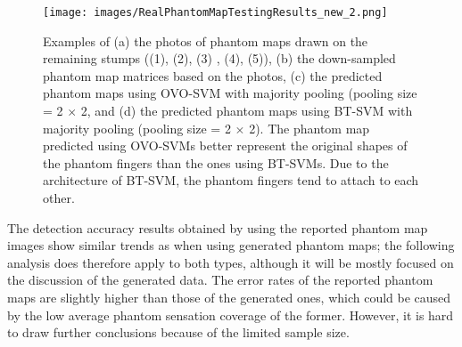  \begin{figure}[hbt!]
 \centering
 \texttt{[image: images/RealPhantomMapTestingResults\_new\_2.png]}
  \caption{Examples of (a) the photos of  phantom maps drawn on the remaining stumps ((1)\cite{antfolk2012sensory}, (2)\cite{bjorkman2016sensory}, (3) \cite{chai2015characterization}, (4)\cite{chai2015characterization}, (5)\cite{bjorkman2016sensory}),  (b) the down-sampled phantom map matrices based on the photos,  (c) the predicted phantom maps using OVO-SVM with majority pooling (pooling size = 2 $\times$ 2, and (d) the predicted phantom maps using BT-SVM with majority pooling (pooling size = 2 $\times$ 2).  The phantom map predicted using OVO-SVMs better represent the original shapes of the phantom fingers than the ones using BT-SVMs. Due to the architecture of BT-SVM, the phantom fingers tend to attach to each other.}
  \label{fig:reported_phantom_map_classification}
 \end{figure}

The detection accuracy results obtained by using the reported phantom  map images show similar trends as when using generated phantom maps; the  following analysis does therefore apply to both types, although it will  be mostly focused on the discussion of the generated data. The error  rates of the reported phantom maps are slightly higher than those of the  generated ones, which could be caused by the low average phantom sensation coverage of the former. However, it is hard to draw further conclusions because of the limited sample size.




